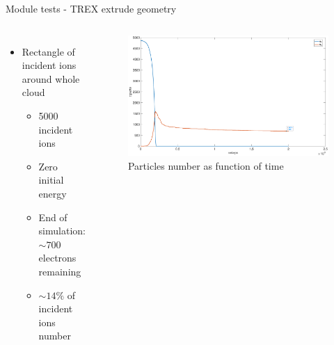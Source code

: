 \documentclass[aspectratio=169,xcolor=dvipsnames,8pt]{beamer}
\begin{document}
  \begin{frame}{Module tests - TREX extrude geometry}
     \begin{columns}[c] %

	\begin{itemize}


		\item{Rectangle of incident ions around whole cloud \\
			\begin{itemize}
		
				\item{5000 incident ions}
				\item{Zero initial energy}
				\item{End of simulation: $\sim 700$ electrons remaining}
				\item{$ \sim 14 \%$ of incident ions number}
				\end{itemize}}
				
						
	\end{itemize}

		\begin{figure}[h!]
		\includegraphics[width=1 \textwidth]{parts_number_wholde_cloud}
		\caption{\label{img1} Particles number as function of time}
		\end{figure}
     \end{columns}
\end{frame}


\end{document}
